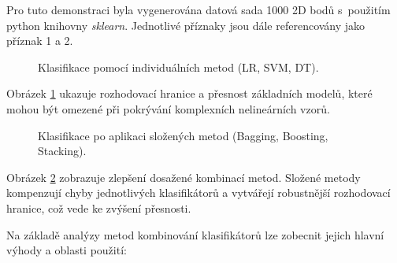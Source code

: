 Pro tuto demonstraci byla vygenerována datová sada 1000 2D bodů s~použitím python knihovny \textit{sklearn}. Jednotlivé příznaky jsou dále referencovány jako příznak 1 a 2.



\begin{figure}[h!]
    \centering
    \caption{Klasifikace pomocí individuálních metod (LR, SVM, DT).}
    \label{fig:before_sloz}
\end{figure}

Obrázek \ref{fig:before_sloz} ukazuje rozhodovací hranice a přesnost základních modelů, které mohou být omezené při pokrývání komplexních nelineárních vzorů.

\begin{figure}[h!]
    \centering
    \caption{Klasifikace po aplikaci složených metod (Bagging, Boosting, Stacking).}
    \label{fig:after_sloz}
\end{figure}

Obrázek \ref{fig:after_sloz} zobrazuje zlepšení dosažené kombinací metod. Složené metody kompenzují chyby jednotlivých klasifikátorů a vytvářejí robustnější rozhodovací hranice, což vede ke zvýšení přesnosti.

Na základě analýzy metod kombinování klasifikátorů lze zobecnit jejich hlavní výhody a oblasti použití:

